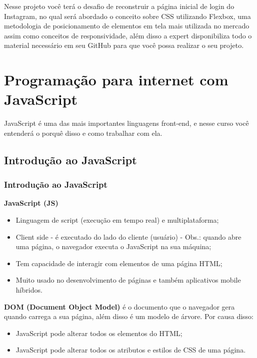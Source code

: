 \documentclass[12pt,a4paper]{article}
\begin{document}
	Nesse projeto você terá o desafio de reconstruir a página inicial de login do Instagram, no qual será abordado o conceito sobre CSS utilizando Flexbox, uma metodologia de posicionamento de elementos em tela mais utilizada no mercado assim como conceitos de responsividade, além disso a expert disponibiliza todo o material necessário em seu GitHub para que você possa realizar o seu projeto.
	
	\section{Programação para internet com JavaScript}
	
	JavaScript é uma das mais importantes linguagens front-end, e nesse curso você entenderá o porquê disso e como trabalhar com ela.
	
	\subsection{Introdução ao JavaScript}
	\subsubsection{Introdução ao JavaScript}
	
	\textbf{JavaScript (JS)}
	
	\begin{itemize}
		\item Linguagem de script (execução em tempo real) e multiplataforma;
		\item Client side - é executado do lado do cliente (usuário) - Obs.: quando abre uma página, o navegador executa o JavaScript na sua máquina;
		\item Tem capacidade de interagir com elementos de uma página HTML;
		\item Muito usado no desenvolvimento de páginas e também aplicativos mobile híbridos.
	\end{itemize}

	\textbf{DOM (Document Object Model)} é o documento que o navegador gera quando carrega a sua página, além disso é um modelo de árvore. Por causa disso:
	
	\begin{itemize}
		\item JavaScript pode alterar todos os elementos do HTML;
		\item JavaScript pode alterar todos os atributos e estilos de CSS de uma página.
	\end{itemize}
\end{document}
